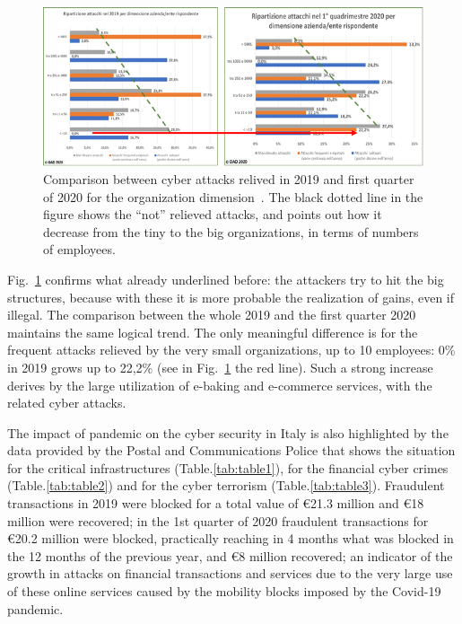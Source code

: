 \documentclass{easychair}
\begin{document}
\begin{figure}
	\centering
		\includegraphics[width=1\textwidth]{pictures/fig3.png}
		\caption{Comparison between cyber attacks relived in 2019 and first quarter of 2020 for the organization dimension~\cite{oad20}. The black dotted line in the figure shows 
the “not” relieved attacks, and points out how it decrease from the tiny to the big organizations, in terms of numbers of employees. }
		\label{fig:3}
\end{figure}

Fig.~\ref{fig:3} confirms what already underlined before: the attackers try to hit the big structures, because with these it is more probable the realization of gains, even if illegal.
The comparison between the whole 2019 and the first quarter 2020 maintains the same logical trend. The only meaningful difference is for the frequent attacks relieved by the very
small organizations, up to 10 employees: 0\% in 2019 grows up to 22,2\% (see in Fig.~\ref{fig:3} the red line). Such a strong increase derives by the large utilization of e-baking and 
e-commerce services, with the related cyber attacks.

The impact of pandemic on the cyber security in Italy is also highlighted by the data provided by the Postal and Communications Police that shows the situation for the
critical infrastructures (Table.\ref{tab:table1}), for the financial cyber crimes (Table.\ref{tab:table2}) and for the cyber terrorism (Table.\ref{tab:table3}). 
Fraudulent transactions in 2019 were blocked for a total value of \euro 21.3 million and \euro 18 million were recovered; in the 1st quarter of 
2020 fraudulent transactions for \euro 20.2 million were blocked, practically reaching in 4 months what was blocked in the 12 months of the previous year, and \euro 8 million 
recovered; an indicator of the growth in attacks on financial transactions and services due to the very large use of these online services caused by the mobility blocks imposed 
by the Covid-19 pandemic.
\end{document}
